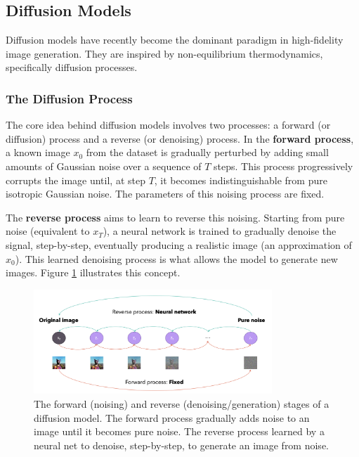\subsection{Diffusion Models}
Diffusion models have recently become the dominant paradigm in high-fidelity image generation. They are inspired by non-equilibrium thermodynamics, specifically diffusion processes.

\subsubsection{The Diffusion Process}
The core idea behind diffusion models involves two processes: a forward (or diffusion) process and a reverse (or denoising) process.
In the \textbf{forward process}, a known image $x_0$ from the dataset is gradually perturbed by adding small amounts of Gaussian noise over a sequence of $T$ steps. This process progressively corrupts the image until, at step $T$, it becomes indistinguishable from pure isotropic Gaussian noise. The parameters of this noising process are fixed.

The \textbf{reverse process} aims to learn to reverse this noising. Starting from pure noise (equivalent to $x_T$), a neural network is trained to gradually denoise the signal, step-by-step, eventually producing a realistic image (an approximation of $x_0$). This learned denoising process is what allows the model to generate new images. Figure \ref{fig:diffusion-process} illustrates this concept.

\begin{figure}[h]
  \centering
  \includegraphics[width=0.8\textwidth]{images/related-work/diffusion-process.png}
  \caption{The forward (noising) and reverse (denoising/generation) stages of a diffusion model. The forward process gradually adds noise to an image until it becomes pure noise. The reverse process learned by a neural net to denoise, step-by-step, to generate an image from noise.}
  \label{fig:diffusion-process}
\end{figure}


